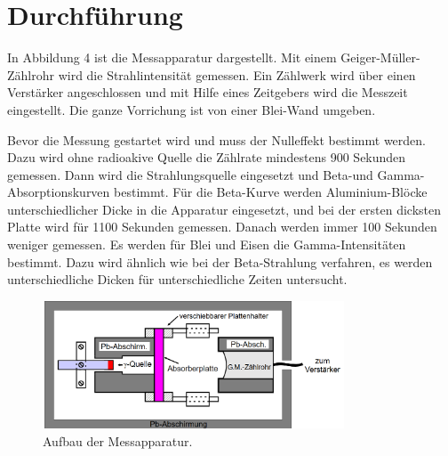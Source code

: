 \section{Durchführung}
\label{sec:Durchführung}

In Abbildung 4 ist die Messapparatur dargestellt.
Mit einem Geiger-Müller-Zählrohr wird die Strahlintensität gemessen.
Ein Zählwerk wird über einen Verstärker angeschlossen und mit Hilfe eines Zeitgebers wird die Messzeit eingestellt.
Die ganze Vorrichung ist von einer Blei-Wand umgeben. 

Bevor die Messung gestartet wird und muss der Nulleffekt bestimmt werden. Dazu wird ohne radioakive Quelle die Zählrate mindestens 900 Sekunden gemessen.
Dann wird die Strahlungsquelle eingesetzt und Beta-und Gamma-Absorptionskurven bestimmt.
Für die Beta-Kurve werden Aluminium-Blöcke unterschiedlicher Dicke in die Apparatur eingesetzt, und bei der ersten dicksten Platte wird für 1100 Sekunden gemessen.
Danach werden immer 100 Sekunden weniger gemessen.
Es werden für Blei und Eisen die  Gamma-Intensitäten bestimmt. Dazu wird ähnlich wie bei der Beta-Strahlung verfahren, es werden unterschiedliche Dicken für unterschiedliche Zeiten untersucht.

\begin{figure}[H]
  \centering
  \includegraphics[width=0.8\textwidth]{messapparatur.png}
  \caption{Aufbau der Messapparatur.\cite[S.14]{kent}}
  \label{fig:aufbau}
\end{figure}
